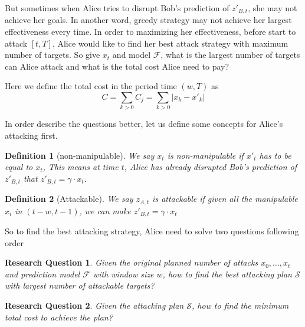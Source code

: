 \documentclass[journal]{IEEEtran}
\newtheorem{definition}{Definition}
\newtheorem{RQ}{Research Question}
\begin{document}
But sometimes when Alice tries to disrupt Bob's prediction of $z'_{B,t}$, she may not achieve her goals. {\color{purple}In another word, greedy strategy may not achieve her largest effectiveness every time. In order to maximizing her effectiveness, before start to attack $[t, T]$, Alice would like to find her best attack strategy with maximum number of targets.} So give $x_t$ and model $\mathcal{F}$, what is the largest number of targets can Alice attack and what is the total cost Alice need to pay?

Here we define the total cost in the period time $(w, T)$ as 
$$
C=\sum_{k>0}C_{j}=\sum_{k>0} \left|x_k -x'_k\right|
$$

In order describe the questions better, let us define some concepts for Alice's attacking first.

\begin{definition}[non-manipulable]
We say $x_t$ is non-manipulable if $x'_t$ has to be equal to $x_t$, {\color{purple}This means at time $t$, Alice has already disrupted Bob's prediction of $z'_{B,t}$ that $z'_{B,t}=\gamma \cdot x_t$.}
\end{definition}


\begin{definition}[Attackable]
We say $z_{A,t}$ is attackable if given all the manipulable $x_i$ in $(t-w,t-1)$, we can make $z'_{B,t}=\gamma \cdot x_{t}$
\end{definition}

So to find the best attacking strategy, Alice need to solve two questions following order

\begin{RQ}
Given the original planned number of attacks $x_0, \dots, x_t$ and prediction model $\mathcal{F}$ with window size $w$, how to find the best attacking plan $\mathcal{S}$ with largest number of attackable targets?
\end{RQ}

\begin{RQ}
Given the attacking plan $\mathcal{S}$, how to find the minimum total cost to achieve the plan?
\end{RQ}
\end{document}
